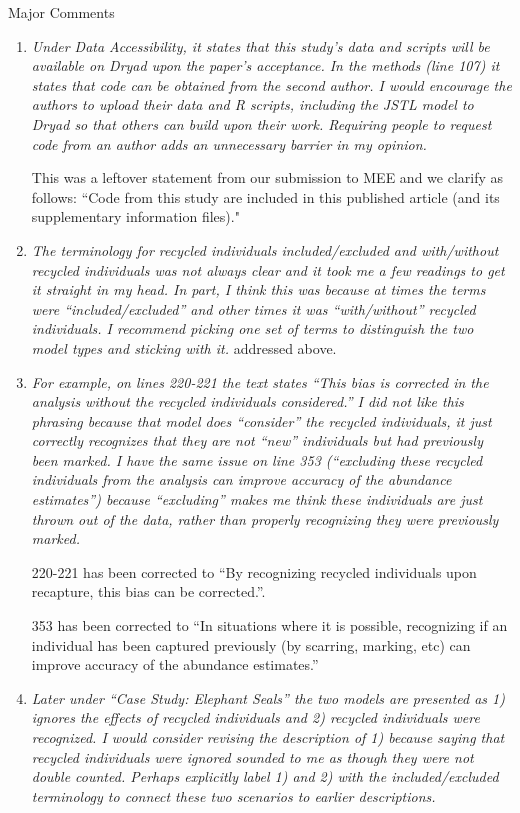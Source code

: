 \documentclass[12pt]{article}
\begin{document}
\bigskip

\noindent Major Comments
\begin{enumerate}
\item  {\it Under Data Accessibility, it states that this study’s data and scripts will be available on Dryad upon the paper’s acceptance. In the methods (line 107) it states that code can be obtained from the second author. I would encourage the authors to upload their data and R scripts, including the JSTL model to Dryad so that others can build upon their work. Requiring people to request code from an author adds an unnecessary barrier in my opinion.}

This was a leftover statement from our submission to MEE and we clarify as follows:
``Code from this study are included in this published article (and its supplementary information files)."

\item  {\it The terminology for recycled individuals included/excluded and with/without recycled individuals was not always clear and it took me a few readings to get it straight in my head. In part, I think this was because at times the terms were “included/excluded” and other times it was “with/without” recycled individuals. I recommend picking one set of terms to distinguish the two model types and sticking with it.}
addressed above.

\item {\it For example, on lines 220-221 the text states “This bias is corrected in the analysis without the recycled individuals considered.” I did not like this phrasing because that model does “consider” the recycled individuals, it just correctly recognizes that they are not “new” individuals but had previously been marked. I have the same issue on line 353 (“excluding these recycled individuals from the analysis can improve accuracy of the abundance estimates”) because “excluding” makes me think these individuals are just thrown out of the data, rather than properly recognizing they were previously marked.}

220-221 has been corrected to ``By recognizing recycled individuals upon recapture, this bias can be corrected.''. 

353 has been corrected to ``In
situations where it is possible, recognizing if an individual has been
captured previously (by scarring, marking, etc) can improve accuracy of the
abundance estimates.''

\item {\it Later under “Case Study: Elephant Seals” the two models are presented as 1) ignores the effects of recycled individuals and 2) recycled individuals were recognized. I would consider revising the description of 1) because saying that recycled individuals were ignored sounded to me as though they were not double counted. Perhaps explicitly label 1) and 2) with the included/excluded terminology to connect these two scenarios to earlier descriptions.}


\end{enumerate}
\end{document}
